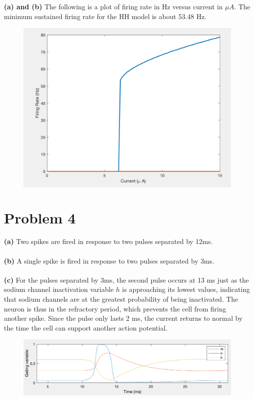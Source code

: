 \documentclass[]{article}
\begin{document}
\textbf{(a) and (b)} The following is a plot of firing rate in Hz versus current in $\mu A$. The minimum sustained firing rate for the HH model is about 53.48 Hz.

\begin{figure}
    \centering
    \includegraphics[scale=0.5]{const_current_firing_rate.png}
    \label{fig:const_current}
\end{figure}

\section*{Problem 4}

\textbf{(a)} Two spikes are fired in response to two pulses separated by 12ms.
\\\\

\textbf{(b)} A single spike is fired in response to two pulses separated by 3ms.
\\\\

\textbf{(c)} For the pulses separated by 3ms, the second pulse occurs at 13 ms just as the sodium channel inactivation variable $h$ is approaching its lowest values, indicating that sodium channels are at the greatest probability of being inactivated. The neuron is thus in the refractory period, which prevents the cell from firing another spike. Since the pulse only lasts 2 ms, the current returns to normal by the time the cell can support another action potential.
\begin{figure}
    \centering
    \includegraphics[scale=0.5]{gating3ms.png}
    \label{fig:gating3ms}
\end{figure}
\end{document}
